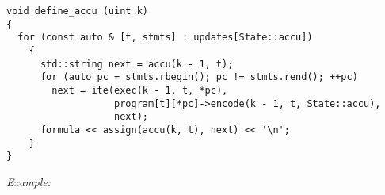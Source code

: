 %
%

\begin{lstlisting}[style=c++]
void define_accu (uint k)
{
  for (const auto & [t, stmts] : updates[State::accu])
    {
      std::string next = accu(k - 1, t);
      for (auto pc = stmts.rbegin(); pc != stmts.rend(); ++pc)
        next = ite(exec(k - 1, t, *pc),
                   program[t][*pc]->encode(k - 1, t, State::accu),
                   next);
      formula << assign(accu(k, t), next) << '\n';
    }
}
\end{lstlisting}

\noindent
\emph{Example:} 

